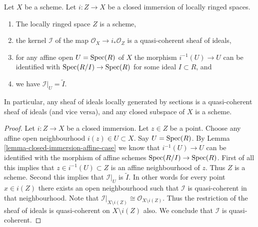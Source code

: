 \begin{lemma}
\label{lemma-closed-subspace-scheme}
Let $X$ be a scheme. Let $i : Z \to X$ be a closed immersion
of locally ringed spaces.
\begin{enumerate}
\item The locally ringed space $Z$ is a scheme,
\item the kernel $\mathcal{I}$ of the map
$\mathcal{O}_X \to i_*\mathcal{O}_Z$ is a quasi-coherent
sheaf of ideals,
\item for any affine open $U = \mathop{\rm Spec}(R)$ of $X$
the morphism $i^{-1}(U) \to U$ can be identified with
$\mathop{\rm Spec}(R/I) \to \mathop{\rm Spec}(R)$ for some ideal $I \subset R$, and
\item we have $\mathcal{I}|_U = \widetilde I$.
\end{enumerate}
In particular, any sheaf of ideals locally generated by sections
is a quasi-coherent sheaf of ideals (and vice versa),
and any closed subspace of $X$ is a scheme.
\end{lemma}

\begin{proof}
Let $i : Z \to X$ be a closed immersion.
Let $z \in Z$ be a point. Choose any affine open
neighbourhood $i(z) \in U \subset X$. Say $U = \mathop{\rm Spec}(R)$.
By Lemma \ref{lemma-closed-immersion-affine-case} we know
that $i^{-1}(U) \to U$ can be identified with the morphism
of affine schemes $\mathop{\rm Spec}(R/I) \to \mathop{\rm Spec}(R)$.
First of all this implies that $z \in i^{-1}(U) \subset Z$ is an
affine neighbourhood of $z$. Thus $Z$ is a scheme. Second
this implies that $\mathcal{I}|_U$ is $\widetilde I$.
In other words for every point $x \in i(Z)$ there exists an
open neighbourhood such that $\mathcal{I}$ is quasi-coherent in
that neighbourhood. Note that $\mathcal{I}|_{X \setminus i(Z)}
\cong \mathcal{O}_{X \setminus i(Z)}$. Thus the restriction
of the sheaf of ideals is quasi-coherent on $X \setminus i(Z)$
also. We conclude that $\mathcal{I}$ is quasi-coherent.
\end{proof}

